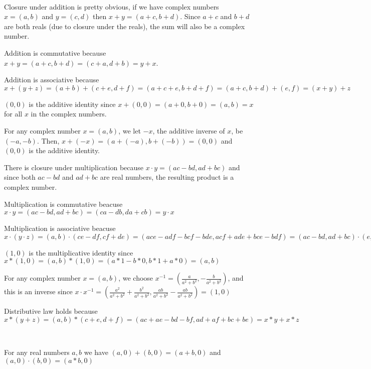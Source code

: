 \documentclass{article}
\begin{document}
\begin{customproof}
\


Closure under addition is pretty obvious, if we have complex numbers $x = (a,b)$ and $y = (c,d)$ then $x+y = (a+c,b+d)$. Since $a+c$ and $b+d$ are both reals (due to closure under the reals), the sum will also be a complex number. 

Addition is commutative because $x+y = (a+c, b+d) = (c+a, d+b) = y+x$.

Addition is associative because $x+(y+z) = (a+b)+(c+e, d+f) = (a+c+e, b+d+f) = (a+c, b+d) + (e,f) = (x+y) + z$

$(0,0)$ is the additive identity since $x + (0,0) = (a+0, b+0) = (a,b) = x$ for all $x$ in the complex numbers.

For any complex number $x = (a,b)$, we let $-x$, the additive inverse of $x$, be $(-a,-b)$. Then, $x+ (-x) = (a + (-a), b + (-b)) = (0,0)$ and $(0,0)$ is the additive identity.

There is closure under multiplication because $x\cdot y = (ac-bd, ad+bc)$ and since both $ac-bd$ and $ad+bc$ are real numbers, the resulting product is a complex number.

Multiplication is commutative beacuse $x \cdot y = (ac-bd, ad+bc) = (ca-db, da+cb) = y \cdot x$

Multiplication is associative beacuse $x \cdot (y \cdot z) = (a,b) \cdot (ce-df, cf+de) = (ace-adf - bcf - bde, acf + ade + bce - bdf) = (ac-bd, ad+bc) \cdot (e,f) = (x \cdot y) \cdot z$

$(1,0)$ is the multiplicative identity since $x * (1,0) = (a,b) * (1,0) = (a*1-b*0, b*1 + a* 0 ) = (a,b)$

For any complex number $x=(a,b)$, we choose $x ^{-1}  = (\frac{a}{a^2+b^2}, -\frac{b}{a^2+b^2})$, and this is an inverse since $x \cdot x ^{-1} = (\frac{a^2}{a^2+b^2} + \frac{b^2}{a^2+b^2}, \frac{ab}{a^2+b^2}-\frac{ab}{a^2+b^2})  =(1,0)$

Distributive law holds because $x*(y+z) = (a,b) * (c+e, d+f) = (ac+ae-bd-bf, ad+af + bc+be) = x*y + x*z$
\end{customproof}

\begin{theorem}
\

For any real numbers $a,b$ we have $(a,0)+ (b,0) = (a+b,0)$ and $(a,0) \cdot (b,0) = (a*b,0)$
\end{theorem}
\end{document}
